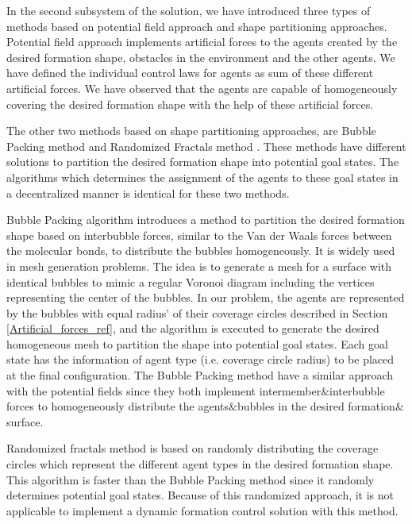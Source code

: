 In the second subsystem of the solution, we have introduced three types of methods based on potential field approach and shape partitioning approaches. Potential field approach implements artificial forces to the agents created by the desired formation shape, obstacles in the environment and the other agents. We have defined the individual control laws for agents as sum of these different artificial forces. We have observed that the agents are capable of homogeneously covering the desired formation shape with the help of these artificial forces.

The other two methods based on shape partitioning approaches, are Bubble Packing method and Randomized Fractals method . These methods have different solutions to partition the desired formation shape into potential goal states. The algorithms which determines the assignment of the agents to these goal states in a decentralized manner is identical for these two methods. 

Bubble Packing algorithm introduces a method to partition the desired formation shape based on interbubble forces, similar to the Van der Waals forces between the molecular bonds, to distribute the bubbles homogeneously. It is widely used in mesh generation problems. The idea is to generate a mesh for a surface with identical bubbles to mimic a regular Voronoi diagram including the vertices representing the center of the bubbles. In our problem, the agents are represented by the  bubbles with equal radius' of their coverage circles described in Section \ref{Artificial_forces_ref}, and the algorithm is executed to generate the desired homogeneous mesh to partition the shape into potential goal states. Each goal state has the information of agent type (i.e. coverage circle radius) to be placed at the final configuration. The Bubble Packing method have a similar approach with the potential fields since they both implement intermember$\&$interbubble forces to homogeneously distribute the agents$\&$bubbles in the desired formation$\&$surface.
       
Randomized fractals method is based on randomly distributing the coverage circles which represent the different agent types in the desired formation shape. This algorithm is faster than the Bubble Packing method since it randomly determines potential goal states. Because of this randomized approach, it is not applicable to implement a dynamic formation control solution with this method. 
       
